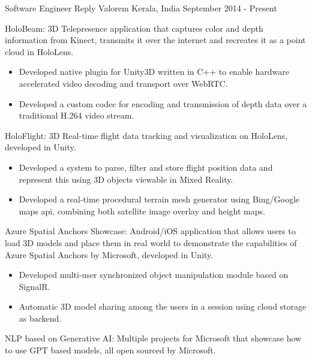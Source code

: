 \documentclass[11pt, a4paper]{awesome-cv}
\begin{document}
\begin{cventries}
	\cventry
	{Software Engineer} %
	{Reply Valorem} %
	{Kerala, India} %
	{September 2014 - Present} %
	{
		\begin{cvitems} %
			\item HoloBeam: 3D Telepresence application that captures color and depth information from Kinect, transmits it over the internet and recreates it as a point cloud in HoloLens.
				\begin{itemize} 
					\item Developed native plugin for Unity3D written in C++ to enable hardware accelerated video decoding and transport over WebRTC.
					\item Developed a custom codec for encoding and transmission of depth data over a traditional H.264 video stream.
				\end{itemize}
\vspace{1mm}
			\item HoloFlight: 3D Real-time flight data tracking and visualization on HoloLens, developed in Unity.
				\begin{itemize}
					\item Developed a system to parse, filter and store flight position data and represent this using 3D objects viewable in Mixed Reality.
					\item Developed a real-time procedural terrain mesh generator using Bing/Google maps api, combining both satellite image overlay and height maps.
				\end{itemize}
\vspace{1mm}
			\item Azure Spatial Anchors Showcase: Android/iOS application that allows users to load 3D models and place them in real world to demonstrate the capabilities of Azure Spatial Anchors by Microsoft, developed in Unity.
				\begin{itemize}
					\item Developed multi-user synchronized object manipulation module based on SignalR.
					\item Automatic 3D model sharing among the users in a session using cloud storage as backend.
				\end{itemize}
\vspace{1mm}
			\item NLP based on Generative AI: Multiple projects for Microsoft that showcase how to use GPT based models, all open sourced by Microsoft.

\end{cvitems}}
\end{cventries}
\end{document}
